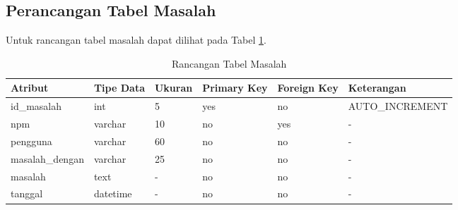 \subsection{Perancangan Tabel Masalah}
Untuk rancangan tabel masalah dapat dilihat pada Tabel
\ref{tab:rancangantabelmasalah}.

\begin{table}[ht]
\caption[Tabel Rancangan Tabel Masalah]{Rancangan Tabel Masalah}
\label{tab:rancangantabelmasalah}
\centering
\begin{tabular}{|l|l|p{1.2cm}|p{1.2cm}|p{1.2cm}|l|}
\hline
Atribut & Tipe Data & Ukuran & Primary Key & Foreign Key & Keterangan\\
\hline
id\_masalah & int & 5 & yes & no & AUTO\_INCREMENT\\
\hline
npm & varchar & 10 & no & yes & -\\
\hline
pengguna & varchar & 60 & no & no & -\\
\hline
masalah\_dengan & varchar & 25 & no & no & -\\
\hline
masalah & text & - & no & no & -\\
\hline
tanggal & datetime & - & no & no & -\\
\hline
\end{tabular}
\end{table}






